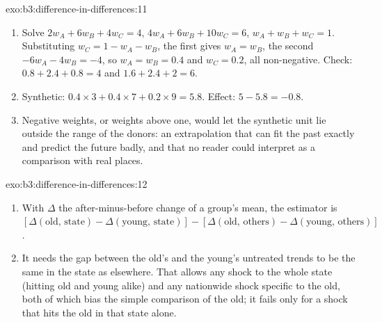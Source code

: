 \begin{solution}{exo:b3:difference-in-differences:11}
\begin{enumerate}
\item Solve $2w_A + 6w_B + 4w_C = 4$, $4w_A + 6w_B + 10w_C = 6$, $w_A + w_B + w_C =
1$. Substituting $w_C = 1 - w_A - w_B$, the first gives $w_A = w_B$, the second
$-6w_A - 4w_B = -4$, so $w_A = w_B = 0.4$ and $w_C = 0.2$, all non-negative.
Check: $0.8 + 2.4 + 0.8 = 4$ and $1.6 + 2.4 + 2 = 6$.
\item Synthetic: $0.4 \times 3 + 0.4 \times 7 + 0.2 \times 9 = 5.8$. Effect: $5 -
5.8 = -0.8$.
\item Negative weights, or weights above one, would let the synthetic unit lie
outside the range of the donors: an extrapolation that can fit the past exactly
and predict the future badly, and that no reader could interpret as a
comparison with real places.
\end{enumerate}
\end{solution}

\begin{solution}{exo:b3:difference-in-differences:12}
\begin{enumerate}
\item With $\Delta$ the after-minus-before change of a group's mean, the
estimator is $[\Delta(\text{old, state}) - \Delta(\text{young, state})] -
[\Delta(\text{old, others}) - \Delta(\text{young, others})]$.
\item It needs the gap between the old's and the young's untreated trends to be
the same in the state as elsewhere. That allows any shock to the whole state
(hitting old and young alike) and any nationwide shock specific to the old,
both of which bias the simple comparison of the old; it fails only for a shock
that hits the old in that state alone.
\end{enumerate}
\end{solution}

